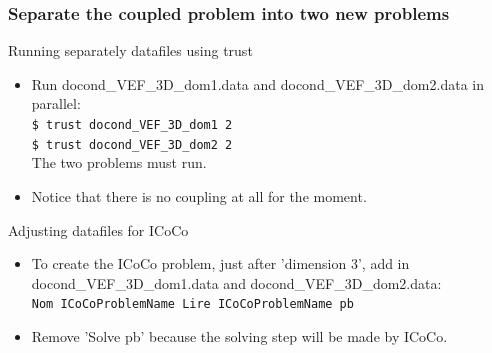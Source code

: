 \documentclass[10pt, hyperref={unicode=true,pdfusetitle, bookmarks=true,bookmarksnumbered=false,bookmarksopen=false, breaklinks=false,pdfborder={0 0 1},backref=true,colorlinks=true,linkcolor=darkblue,pageanchor, urlcolor=darkblue}]{beamer}
\begin{document}
\begin{frame}
\frametitle{Separate the coupled problem into two new problems}

\begin{block}{Running separately datafiles using trust}
\begin{itemize}
\item Run docond\_VEF\_3D\_dom1.data and docond\_VEF\_3D\_dom2.data in parallel:\\
\texttt{\$ trust docond\_VEF\_3D\_dom1 2 }\\
\texttt{\$ trust docond\_VEF\_3D\_dom2 2 }\\
 The two problems must run.
\item Notice that there is no coupling at all for the moment.
\end{itemize}
\end{block}

\begin{block}{Adjusting datafiles for ICoCo}
\begin{itemize}
\item To create the ICoCo problem, just after 'dimension 3', add in docond\_VEF\_3D\_dom1.data and docond\_VEF\_3D\_dom2.data:\\
\texttt{Nom ICoCoProblemName Lire ICoCoProblemName pb}
\item Remove 'Solve pb' because the solving step will be made by ICoCo.
\end{itemize}
\end{block}

\end{frame}
\end{document}
